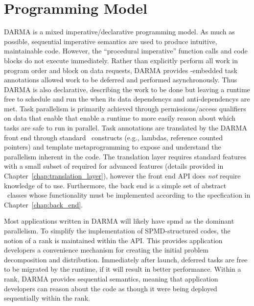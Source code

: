 
\section{Programming Model}
\label{sec:programming_model}
DARMA is a mixed \gls{imperative}/\gls{declarative} \gls{programming model}.
As much as possible, sequential imperative semantics are used to produce intuitive, maintainable code.
However, the ``procedural imperative'' function calls and code blocks do not execute immediately.
Rather than explicitly perform all work in program order and block on data requests,
 DARMA provides \CC-embedded task annotations allowed work to be
 deferred and performed asynchronously.
Thus DARMA is also declarative, describing the work to be done but leaving a runtime free to schedule and run the when its data \glspl{dependency} and
\glspl{anti-dependency} are met.  
Task parallelism is primarily achieved through permissions/access qualifiers
on data that enable that enable a runtime to more easily reason about which tasks are safe to run in parallel. 
Task annotations are translated by
the DARMA front end through standard \CC\ constructs (e.g., lambdas,
  reference counted pointers) and \gls{template
metaprogramming} to expose and understand the parallelism inherent in the code.  
The \gls{translation layer} requires  standard features with a small subset of
 required for advanced features (details provided in
    Chapter~\ref{chap:translation_layer}), 
  however the \gls{front end} \gls{API} does \emph{not}
require knowledge of  to use. Furthermore, the \gls{back end} is a
simple set of abstract \CC\ classes whose functionality must be implemented
according to the specfication in Chapter~\ref{chap:back_end}.


Most applications written in DARMA will likely have \gls{spmd} as the dominant parallelism.
To simplify the implementation of SPMD-structured codes, the notion of a \gls{rank} is maintained within the \gls{API}.   
This provides application developers a convenience mechanism for creating
the initial problem decomposition and distribution.  Immediately after launch, deferred tasks
are free to be migrated by the runtime, if it will result in
better performance. 
Within a \gls{rank}, DARMA provides \gls{sequential semantics}, 
meaning that application developers can reason about the code as
though it were being deployed sequentially within the rank.   



